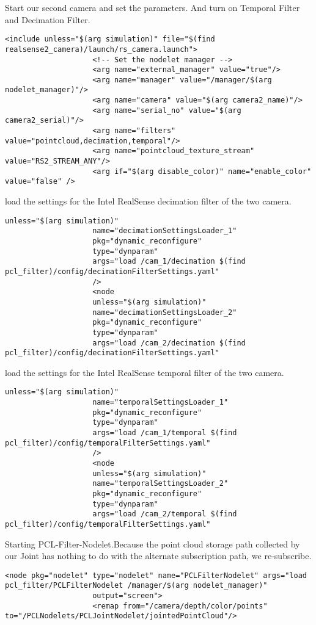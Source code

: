 				Start our second camera and set the parameters. And turn on Temporal Filter and Decimation Filter.\\
				\begin{lstlisting}[caption={}]
					<include unless="$(arg simulation)" file="$(find realsense2_camera)/launch/rs_camera.launch">
					<!-- Set the nodelet manager -->
					<arg name="external_manager" value="true"/>
					<arg name="manager" value="/manager/$(arg nodelet_manager)"/>
					<arg name="camera" value="$(arg camera2_name)"/>
					<arg name="serial_no" value="$(arg camera2_serial)"/>
					<arg name="filters" value="pointcloud,decimation,temporal"/>
					<arg name="pointcloud_texture_stream" value="RS2_STREAM_ANY"/>
					<arg if="$(arg disable_color)" name="enable_color" value="false" /> 
				\end{lstlisting}
				
				load the settings for the Intel RealSense decimation filter of the two camera.\\
				\begin{lstlisting}[caption={}]
					unless="$(arg simulation)"
					name="decimationSettingsLoader_1"
					pkg="dynamic_reconfigure"
					type="dynparam"
					args="load /cam_1/decimation $(find pcl_filter)/config/decimationFilterSettings.yaml"
					/>
					<node
					unless="$(arg simulation)"
					name="decimationSettingsLoader_2"
					pkg="dynamic_reconfigure"
					type="dynparam"
					args="load /cam_2/decimation $(find pcl_filter)/config/decimationFilterSettings.yaml"
				\end{lstlisting}
				
				
				load the settings for the Intel RealSense temporal filter of the two camera.\\
				\begin{lstlisting}[caption={}]
					unless="$(arg simulation)"
					name="temporalSettingsLoader_1"
					pkg="dynamic_reconfigure"
					type="dynparam"
					args="load /cam_1/temporal $(find pcl_filter)/config/temporalFilterSettings.yaml"
					/>
					<node
					unless="$(arg simulation)"
					name="temporalSettingsLoader_2"
					pkg="dynamic_reconfigure"
					type="dynparam"
					args="load /cam_2/temporal $(find pcl_filter)/config/temporalFilterSettings.yaml"
				\end{lstlisting}
				
				Starting PCL-Filter-Nodelet.Because the point cloud storage path collected by our Joint has nothing to do with the alternate subscription path, we re-subscribe.\\
				\begin{lstlisting}[caption={}]
					<node pkg="nodelet" type="nodelet" name="PCLFilterNodelet" args="load pcl_filter/PCLFilterNodelet /manager/$(arg nodelet_manager)"
					output="screen">
					<remap from="/camera/depth/color/points" to="/PCLNodelets/PCLJointNodelet/jointedPointCloud"/>
				\end{lstlisting}
				
